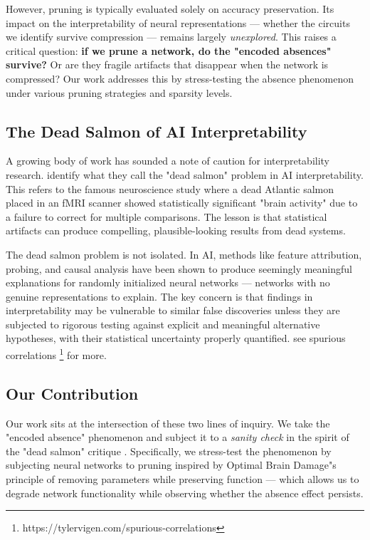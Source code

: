 However, pruning is typically evaluated solely on accuracy preservation. Its impact on the interpretability of neural representations — whether the circuits we identify survive compression — remains largely \textit{unexplored}. This raises a critical question: \textbf{if we prune a network, do the "encoded absences" survive?} Or are they fragile artifacts that disappear when the network is compressed? Our work addresses this by stress-testing the absence phenomenon under various pruning strategies and sparsity levels.

\subsection{\textbf{The Dead Salmon of AI Interpretability}}

A growing body of work has sounded a note of caution for interpretability research. \cite{deadsalmon} identify what they call the "dead salmon" problem in AI interpretability. This refers to the famous neuroscience study where a dead Atlantic salmon placed in an fMRI scanner showed statistically significant "brain activity" due to a failure to correct for multiple comparisons. The lesson is that statistical artifacts can produce compelling, plausible-looking results from dead systems.

The dead salmon problem is not isolated. In AI, methods like feature attribution, probing, and causal analysis have been shown to produce seemingly meaningful explanations for randomly initialized neural networks — networks with no genuine representations to explain. The key concern is that findings in interpretability may be vulnerable to similar false discoveries unless they are subjected to rigorous testing against explicit and meaningful alternative hypotheses, with their statistical uncertainty properly quantified. see spurious correlations \footnote{https://tylervigen.com/spurious-correlations} for more.

\subsection{\textbf{Our Contribution}}

Our work sits at the intersection of these two lines of inquiry. We take the "encoded absence" phenomenon \cite{whatismissing} and subject it to a \textit{sanity check} in the spirit of the "dead salmon" critique \cite{deadsalmon}. Specifically, we stress-test the phenomenon by subjecting neural networks to pruning inspired by Optimal Brain Damage"s principle of removing parameters while preserving function \cite{optimalbraindamage} — which allows us to degrade network functionality while observing whether the absence effect persists.


